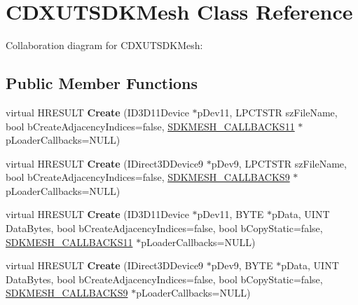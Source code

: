\hypertarget{class_c_d_x_u_t_s_d_k_mesh}{\section{C\+D\+X\+U\+T\+S\+D\+K\+Mesh Class Reference}
\label{class_c_d_x_u_t_s_d_k_mesh}
}


Collaboration diagram for C\+D\+X\+U\+T\+S\+D\+K\+Mesh\+:
\subsection*{Public Member Functions}
\begin{DoxyCompactItemize}
\item 
\hypertarget{class_c_d_x_u_t_s_d_k_mesh_ae2d8f5602baab4439c7729a4b27f4486}{virtual H\+R\+E\+S\+U\+L\+T {\bfseries Create} (I\+D3\+D11\+Device $\ast$p\+Dev11, L\+P\+C\+T\+S\+T\+R sz\+File\+Name, bool b\+Create\+Adjacency\+Indices=false, \hyperlink{struct_s_d_k_m_e_s_h___c_a_l_l_b_a_c_k_s11}{S\+D\+K\+M\+E\+S\+H\+\_\+\+C\+A\+L\+L\+B\+A\+C\+K\+S11} $\ast$p\+Loader\+Callbacks=N\+U\+L\+L)}\label{class_c_d_x_u_t_s_d_k_mesh_ae2d8f5602baab4439c7729a4b27f4486}

\item 
\hypertarget{class_c_d_x_u_t_s_d_k_mesh_a70cb13d36783f664e4d5ff9afe68687f}{virtual H\+R\+E\+S\+U\+L\+T {\bfseries Create} (I\+Direct3\+D\+Device9 $\ast$p\+Dev9, L\+P\+C\+T\+S\+T\+R sz\+File\+Name, bool b\+Create\+Adjacency\+Indices=false, \hyperlink{struct_s_d_k_m_e_s_h___c_a_l_l_b_a_c_k_s9}{S\+D\+K\+M\+E\+S\+H\+\_\+\+C\+A\+L\+L\+B\+A\+C\+K\+S9} $\ast$p\+Loader\+Callbacks=N\+U\+L\+L)}\label{class_c_d_x_u_t_s_d_k_mesh_a70cb13d36783f664e4d5ff9afe68687f}

\item 
\hypertarget{class_c_d_x_u_t_s_d_k_mesh_ae94194bf4b0dcf08da4087bce174aeeb}{virtual H\+R\+E\+S\+U\+L\+T {\bfseries Create} (I\+D3\+D11\+Device $\ast$p\+Dev11, B\+Y\+T\+E $\ast$p\+Data, U\+I\+N\+T Data\+Bytes, bool b\+Create\+Adjacency\+Indices=false, bool b\+Copy\+Static=false, \hyperlink{struct_s_d_k_m_e_s_h___c_a_l_l_b_a_c_k_s11}{S\+D\+K\+M\+E\+S\+H\+\_\+\+C\+A\+L\+L\+B\+A\+C\+K\+S11} $\ast$p\+Loader\+Callbacks=N\+U\+L\+L)}\label{class_c_d_x_u_t_s_d_k_mesh_ae94194bf4b0dcf08da4087bce174aeeb}

\item 
\hypertarget{class_c_d_x_u_t_s_d_k_mesh_a6c343906bf60dd6eda099e9c8d3e3eab}{virtual H\+R\+E\+S\+U\+L\+T {\bfseries Create} (I\+Direct3\+D\+Device9 $\ast$p\+Dev9, B\+Y\+T\+E $\ast$p\+Data, U\+I\+N\+T Data\+Bytes, bool b\+Create\+Adjacency\+Indices=false, bool b\+Copy\+Static=false, \hyperlink{struct_s_d_k_m_e_s_h___c_a_l_l_b_a_c_k_s9}{S\+D\+K\+M\+E\+S\+H\+\_\+\+C\+A\+L\+L\+B\+A\+C\+K\+S9} $\ast$p\+Loader\+Callbacks=N\+U\+L\+L)}\label{class_c_d_x_u_t_s_d_k_mesh_a6c343906bf60dd6eda099e9c8d3e3eab}


\end{DoxyCompactItemize}
